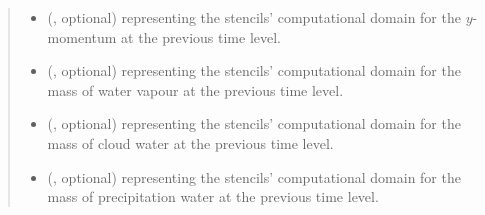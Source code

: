 \documentclass[letterpaper,10pt,english]{sphinxmanual}
\begin{document}
\begin{fulllineitems}
\begin{fulllineitems}
\begin{quote}
\begin{description}
\begin{itemize}
\item {} 
 (, optional) \textendash{}  representing the stencils’ computational domain for the \(y\)-momentum
at the previous time level.

\item {} 
 (, optional) \textendash{}  representing the stencils’ computational domain for the mass of water vapour
at the previous time level.

\item {} 
 (, optional) \textendash{}  representing the stencils’ computational domain for the mass of cloud water
at the previous time level.

\item {} 
 (, optional) \textendash{}  representing the stencils’ computational domain for the mass of precipitation water
at the previous time level.

\end{itemize}

\end{description}\end{quote}

\end{fulllineitems}



\end{fulllineitems}
\end{document}
